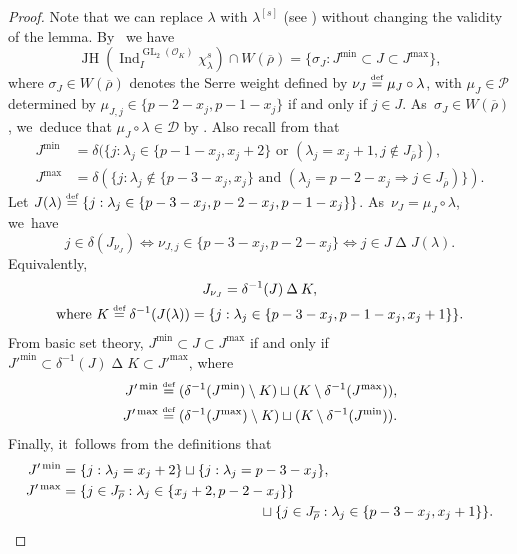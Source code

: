 \documentclass[JEP,XML,SOM,Unicode,NoFloatCountersInSection, NoEqCountersInSection,published]{cedram}
\newcommand{\defeq}{\stackrel{\textrm{\tiny{\upshape{def}}}}{=}}
\newcommand{\cO}{\mathcal{O}}
\newcommand{\D}{\mathscr D}
\newcommand{\brho}{\overline{\rho}}
\DeclareMathOperator{\GL}{GL}
\DeclareMathOperator{\Ind}{Ind}
\DeclareMathOperator{\JH}{\mathrm{JH}}
\theoremstyle{plain}
\theoremstyle{definition}
\begin{document}
\begin{proof}
Note that we can replace $\lambda$ with $\lambda^{[s]}$ {(see \cite[Eq.\,(52)]{BHHMS4})} without changing the validity of the lemma. By~\cite[Prop.\,4.3]{breuil-buzzati} we have
\begin{equation*}
\JH(\Ind_I^{\GL_2(\cO_K)} \chi_\lambda^s) \cap W(\brho) = \{ \sigma_J: J^{\min} \subset J \subset J^{\max} \},
\end{equation*}
where $\sigma_J \in W(\brho)$ denotes the Serre weight defined by $\nu_J \defeq \mu_J \circ \lambda$, with $\mu_J \in \mathcal{P}$ determined by $\mu_{J,j} \in \{p-2-x_j,p-1-x_j\}$ if and only if $j \in J$. As~$\sigma_J \in W(\brho)$, we~deduce that $\mu_J \circ \lambda \in \D$ by \cite[Lemmas 2.1, 2.7]{HuWang2}.
Also recall from \cite[Prop.\,4.3]{breuil-buzzati} that
\begin{align*}
J^{\min} &= \delta(\{ j: \lambda_j \in \{p-1-x_j,x_j+2\} \text{\ or\ } (\lambda_j = x_j+1, j\notin J_{\brho} \}), \\
J^{\max} &= \delta(\{ j: \lambda_j \notin \{p-3-x_j,x_j\} \text{\ and\ } (\lambda_j = p-2-x_j \Rightarrow j\in J_{\brho}) \}).
\end{align*}
Let $J(\lambda) \defeq \{ j: \lambda_j \in \{p-3-x_j,p-2-x_j,p-1-x_j\}\}$. As~$\nu_J = \mu_J \circ \lambda$, we~have
\begin{equation*}
j \in \delta(J_{\nu_J}) \iff \nu_{J,j} \in \{p-3-x_j,p-2-x_j\} \iff j \in J \mathbin\Delta J(\lambda).
\end{equation*}
Equivalently,
\begin{multline}\label{eq:set-K}
J_{\nu_J} = \delta^{-1}(J) \mathbin\Delta K,\\
\text{where\ } K \defeq \delta^{-1}(J(\lambda)) = \{ j: \lambda_j \in \{p-3-x_j,p-1-x_j,x_j+1\}\}.
\end{multline}
From basic set theory, $J^{\min} \subset J \subset J^{\max}$ if and only if $J'^{\min} \subset \delta^{-1}(J) \mathbin\Delta K \subset J'^\max$,
where
\begin{align*}
J'^\min &\defeq (\delta^{-1}(J^{\min}) \setminus K) \sqcup (K \setminus \delta^{-1}(J^{\max})), \\
J'^\max &\defeq (\delta^{-1}(J^{\max}) \setminus K) \sqcup (K \setminus \delta^{-1}(J^{\min})).
\end{align*}
Finally, it~follows from the definitions that
\begin{align*}
J'^\min &= \{ j: \lambda_j = x_j+2\} \sqcup \{ j: \lambda_j = p-3-x_j\}, \\
J'^\max &= \{ j \in J_{\brho}: \lambda_j \in \{x_j+2,p-2-x_j\}\}\\
&\hspace*{5cm} \sqcup \{ j \in J_{\brho}: \lambda_j \in \{p-3-x_j,x_j+1\}\}.\qedhere
\end{align*}
\end{proof}
\end{document}
